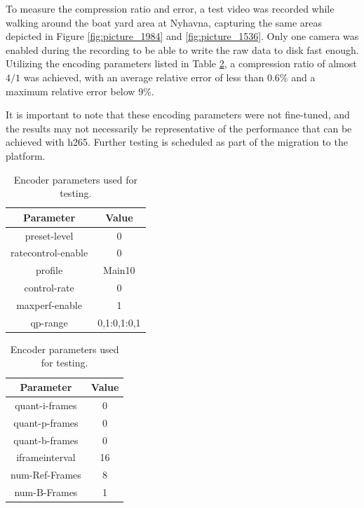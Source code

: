 To measure the compression ratio and error, a test video was recorded while walking around the boat yard area at Nyhavna, capturing the same areas depicted in Figure \ref{fig:picture_1984} and \ref{fig:picture_1536}.
Only one camera was enabled during the recording to be able to write the raw data to disk fast enough.
Utilizing the encoding parameters listed in Table \ref{tab:encoder_parameters}, a compression ratio of almost $4/1$ was achieved, with an average relative error of less than $0.6\%$ and a maximum relative error below $9\%$.

It is important to note that these encoding parameters were not fine-tuned, and the results may not necessarily be representative of the performance that can be achieved with \gls{h265}.
Further testing is scheduled as part of the migration to the \jo platform.
\begin{table}[H]
    \begin{minipage}[b]{.5\linewidth}
        \centering
        \small
        \begin{tabular}{|c|c|}
            \hline
            \textbf{Parameter} & \textbf{Value} \\
            \hline
            preset-level       & 0              \\
            ratecontrol-enable & 0              \\
            profile            & Main10         \\
            control-rate       & 0              \\
            maxperf-enable     & 1              \\
            qp-range           & 0,1:0,1:0,1    \\
            \hline
        \end{tabular}
    \end{minipage}
    \begin{minipage}[b]{.5\linewidth}
        \centering
        \small
        \begin{tabular}{|c|c|}
            \hline
            \textbf{Parameter} & \textbf{Value} \\
            \hline
            quant-i-frames     & 0              \\
            quant-p-frames     & 0              \\
            quant-b-frames     & 0              \\
            iframeinterval     & 16             \\
            num-Ref-Frames     & 8              \\
            num-B-Frames       & 1              \\
            \hline
        \end{tabular}
    \end{minipage}
    \caption{Encoder parameters used for testing.}
    \label{tab:encoder_parameters}
\end{table}

